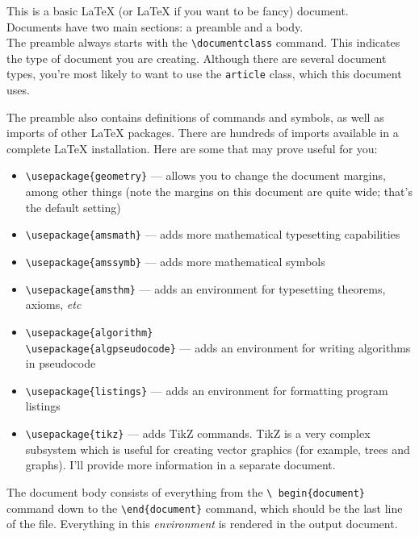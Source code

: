 \documentclass{article}
\begin{document}
This is a basic LaTeX (or \LaTeX{} if you want to be fancy) document.\\[12pt]

Documents have two main sections: a preamble and a body.\\[12pt]

The preamble always starts with the {\tt \textbackslash documentclass} command.
This indicates the type of document you are creating. Although there are several
document types, you're most likely to want to use the {\tt article} class, which
this document uses.

The preamble also contains definitions of commands and symbols, as well as
imports of other \LaTeX{} packages. There are hundreds of imports available in a
complete \LaTeX{} installation. Here are some that may prove useful for you:
\begin{itemize}
  \item {\tt \textbackslash usepackage\{geometry\}} --- allows you to change
  the document margins, among other things (note the margins on this document
  are quite wide; that's the default setting)
  \item {\tt \textbackslash usepackage\{amsmath\}} --- adds more mathematical
  typesetting capabilities
  \item {\tt \textbackslash usepackage\{amssymb\}} --- adds more mathematical
  symbols
  \item {\tt \textbackslash usepackage\{amsthm\}} --- adds an environment for
  typesetting theorems, axioms, \emph{etc}
  \item {\tt \textbackslash usepackage\{algorithm\}}\\
    {\tt \textbackslash usepackage\{algpseudocode\}} --- adds an environment for
    writing algorithms in pseudocode
  \item {\tt \textbackslash usepackage\{listings\}} --- adds an environment for
    formatting program listings
  \item {\tt \textbackslash usepackage\{tikz\}} --- adds TikZ commands. TikZ is
  a very complex subsystem which is useful for creating vector graphics (for
  example, trees and graphs). I'll provide more information in a separate
  document.
\end{itemize}
\vskip 12pt
The document body consists of everything from the {\tt \textbackslash
begin\{document\}} command down to the {\tt \textbackslash end\{document\}}
command, which should be the last line of the file. Everything in this
\emph{environment} is rendered in the output document.\newpage
\end{document}
